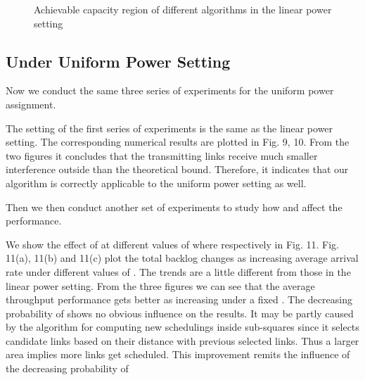 \documentclass[journal]{IEEEtran}
\begin{document}
\begin{comment}
\begin{figure*}
\centering
    \subfigure[Average arrival rate =  ]{
        \texttt{[image: lp-rate20.eps]}}
  \hspace{0cm}
\subfigure[Average arrival rate = ]{
        \texttt{[image: lp-rate27.eps]}}
  \hspace{0cm}
\subfigure[Average arrival rate =]{
        \texttt{[image: lp-rate32.eps]}}
   \caption{{\small{Total backlog vs. time slot vs. different algorithms at different average arrival rate in the linear power setting }}}
   \vspace*{-1\baselineskip}
\end{figure*}
\end{comment}

\begin{figure*}
    \centering
  \hspace{0cm}
  \hspace{0cm}
   \caption{{\small{Achievable capacity region of different algorithms in the linear power setting}}}
\end{figure*}

\subsection{Under Uniform Power Setting}
Now we conduct the same three series of experiments for the uniform power assignment.


The setting of the first series of experiments is the same as the linear power setting. The corresponding numerical results are plotted in Fig. 9, 10. From the two figures it concludes that the transmitting links receive much smaller interference outside than the theoretical bound. Therefore, it indicates that our algorithm is correctly applicable to the uniform power setting as well.

Then we then conduct another set of experiments to study how   and  affect the performance.

We show the effect of  at different values of  where      respectively in Fig. 11. Fig. 11(a), 11(b) and 11(c) plot the total backlog changes as increasing average arrival rate under different values of . The trends are a little different from those in the linear power setting. From the three figures we can see that the average throughput performance gets better as increasing  under a fixed . The decreasing probability of  shows no obvious influence on the results. It may be partly caused by the algorithm for computing new schedulings inside sub-squares since it selects candidate links based on their distance with previous selected links. Thus a larger area implies more links get scheduled. This improvement remits the influence of the decreasing probability of  
\end{document}
